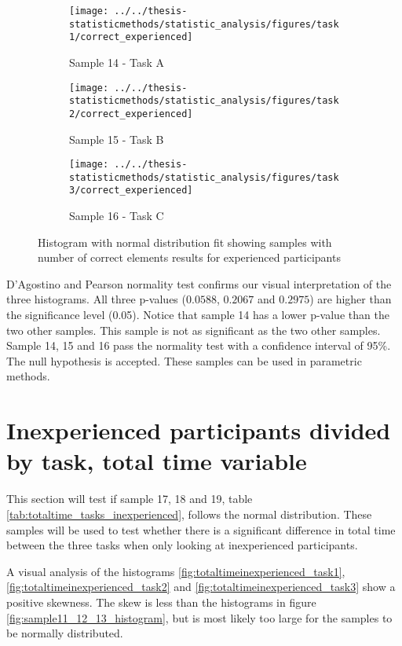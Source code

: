 \begin{appendices}
\begin{figure}[H]
	\centering
	\begin{subfigure}[b]{0.32\textwidth}
		\centering
		\texttt{[image: ../../thesis-statisticmethods/statistic\_analysis/figures/task1/correct\_experienced]}
		\caption{Sample 14 - Task A}
		\label{fig:correctexperienced_task1}
	\end{subfigure}
	\begin{subfigure}[b]{0.32\textwidth}
		\centering
		\texttt{[image: ../../thesis-statisticmethods/statistic\_analysis/figures/task2/correct\_experienced]}
		\caption{Sample 15 - Task B}
		\label{fig:correctexperienced_task2}
	\end{subfigure}
	\begin{subfigure}[b]{0.32\textwidth}
		\centering
		\texttt{[image: ../../thesis-statisticmethods/statistic\_analysis/figures/task3/correct\_experienced]}
		\caption{Sample 16 - Task C}
		\label{fig:correctexperienced_task3}
	\end{subfigure}
	\caption{Histogram with normal distribution fit showing samples with number of correct elements results for experienced participants}
	\label{fig:sample14,15,16_normhistogram}
\end{figure}

D'Agostino and Pearson normality test confirms our visual interpretation of the three histograms. All three p-values ($0.0588$, $0.2067$ and $0.2975$) are higher than the significance level (0.05). Notice that sample 14 has a lower p-value than the two other samples. This sample is not as significant as the two other samples. Sample 14, 15 and 16 pass the normality test with a confidence interval of 95\%. The null hypothesis is accepted. These samples can be used in parametric methods. 

\section{Inexperienced participants divided by task, total time variable}\label{app:norm_17_18_19}

This section will test if sample 17, 18 and 19, table \ref{tab:totaltime_tasks_inexperienced}, follows the normal distribution. These samples will be used to test whether there is a significant difference in total time between the three tasks when only looking at inexperienced participants.

A visual analysis of the histograms \ref{fig:totaltimeinexperienced_task1}, \ref{fig:totaltimeinexperienced_task2} and \ref{fig:totaltimeinexperienced_task3} show a positive skewness. The skew is less than the histograms in figure \ref{fig:sample11_12_13_histogram}, but is most likely too large for the samples to be normally distributed.


\end{appendices}
